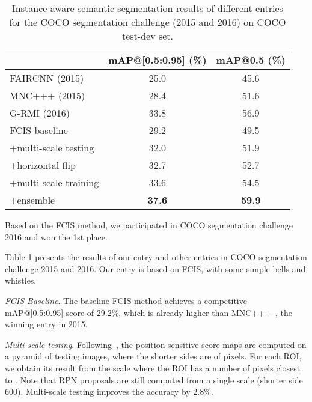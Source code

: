 \documentclass[10pt,twocolumn,letterpaper]{article}
\begin{document}
\setlength{\tabcolsep}{5pt}
\renewcommand{\arraystretch}{1.2}
\begin{table}
\begin{center}
\small
\begin{tabular}{l|c|c}
\hline
 & \scriptsize mAP@[0.5:0.95] (\%) & \scriptsize mAP@0.5 (\%) \\
\hline
\hline
\footnotesize FAIRCNN (2015)                  & 25.0 & 45.6 \\
\footnotesize MNC+++ (2015)                   & 28.4 & 51.6 \\
\footnotesize G-RMI (2016)                    & 33.8 & 56.9 \\
\hline
\footnotesize FCIS baseline                   & 29.2 & 49.5 \\
\footnotesize +multi-scale testing            & 32.0 & 51.9 \\
\footnotesize +horizontal flip                & 32.7 & 52.7 \\
\footnotesize +multi-scale training           & 33.6 & 54.5 \\
\footnotesize +ensemble                       & \textbf{37.6} & \textbf{59.9} \\
\hline
\end{tabular}
\end{center}
\caption{Instance-aware semantic segmentation results of different entries for the COCO segmentation challenge (2015 and 2016) on COCO test-dev set.}
\label{tab:challenge_coco}
\end{table}

Based on the FCIS method, we participated in COCO segmentation challenge 2016 and won the 1st place.

Table \ref{tab:challenge_coco} presents the results of our entry and other entries in COCO segmentation challenge 2015 and 2016. Our entry is based on FCIS, with some simple bells and whistles.

\emph{FCIS Baseline}. The baseline FCIS method achieves a competitive mAP@[0.5:0.95] score of 29.2\%, which is already higher than MNC+++~\cite{dai2016mnc}, the winning entry in 2015. 

\emph{Multi-scale testing}. Following~\cite{he2014spatial,he2016deep}, the position-sensitive score maps are computed on a pyramid of testing images, where the shorter sides are of  pixels. For each ROI, we obtain its result from the scale where the ROI has a number of pixels closest to . Note that RPN proposals are still computed from a single scale (shorter side 600). Multi-scale testing improves the accuracy by 2.8\%. 
\end{document}
